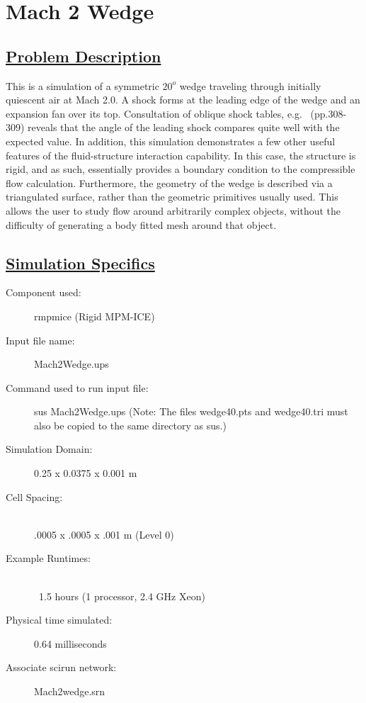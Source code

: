 \documentclass[fleqn]{article}
\begin{document}
\section*{\center Mach 2 Wedge}
\subsection*{\underline{Problem Description}}
This is a simulation of a symmetric $20^o$ wedge traveling through initially
quiescent air at Mach 2.0.  A shock forms at the leading edge of the
wedge and an expansion fan over its top.  Consultation of oblique shock
tables, e.g.~\cite{Saad} (pp.308-309) reveals that the angle of the leading
shock compares quite well with the expected value.  In addition, this
simulation demonstrates a few other useful features of the fluid-structure
interaction capability.  In this case, the structure is rigid, and as
such, essentially provides a boundary condition to the compressible flow
calculation.  Furthermore, the geometry of the wedge is described via a
triangulated surface, rather than the geometric primitives usually used.
This allows the user to study flow around arbitrarily complex objects,
without the difficulty of generating a body fitted mesh around that object.

\subsection*{\underline{Simulation Specifics}}
\begin{description} 
\item [Component used:] \hfill rmpmice (Rigid MPM-ICE)
\item [Input file name:] \hfill Mach2Wedge.ups
\item [Command used to run input file:]\hfill sus Mach2Wedge.ups
(Note: The files wedge40.pts and wedge40.tri must also be copied to
the same directory as sus.)

\item [Simulation Domain:]\hfill    0.25 x 0.0375 x 0.001 m

\item [Cell Spacing:]\hfill \\ 
.0005 x .0005 x .001 m (Level 0)

\item [Example Runtimes:] \hfill \\
 ~1.5 hours   (1 processor, 2.4 GHz Xeon)\\

\item [Physical time simulated:] \hfill 0.64 milliseconds

\item [Associate scirun network:] \hfill Mach2wedge.srn

\end{description}
\end{document}
